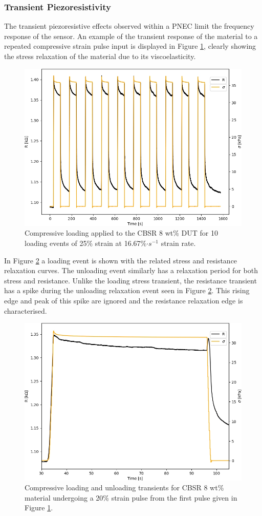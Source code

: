 \subsubsection{Transient Piezoresistivity}\label{sec:Transient Piezoresistivity2}
The transient piezoresistive effects observed within a PNEC limit the frequency response of the sensor. An example of the transient response of the material to a repeated compressive strain pulse input is displayed in Figure \ref{fig:stress_seq}, clearly showing the stress relaxation of the material due to its viscoelasticity. 
\begin{figure}[H]
    \centering
    \includegraphics[width=0.7\linewidth]{Figures/CBSR 8 wt 25p strain - 1D test stress seq.jpg}
    \caption{Compressive loading applied to the CBSR 8 wt\% DUT for 10 loading events of 25\% strain at 16.67\%$\cdot s^{-1}$ strain rate.}
    \label{fig:stress_seq}
\end{figure}
In Figure \ref{fig:load_relax_eg} a loading event is shown with the related stress and resistance relaxation curves. The unloading event similarly has a relaxation period for both stress and resistance. Unlike the loading stress transient, the resistance transient has a spike during the unloading relaxation event seen in Figure \ref{fig:load_relax_eg}. This rising edge and peak of this spike are ignored and the resistance relaxation edge is characterised.  
\begin{figure}[H]
    \centering
    \includegraphics[width=0.7\linewidth]{Figures/CBSR 8 wt 25p strain - 1D stress load unload.jpg}
    \caption{Compressive loading and unloading transients for CBSR 8 wt\% material undergoing a 20\% strain pulse from the first pulse given in Figure \ref{fig:stress_seq}.}
    \label{fig:load_relax_eg}
\end{figure}
